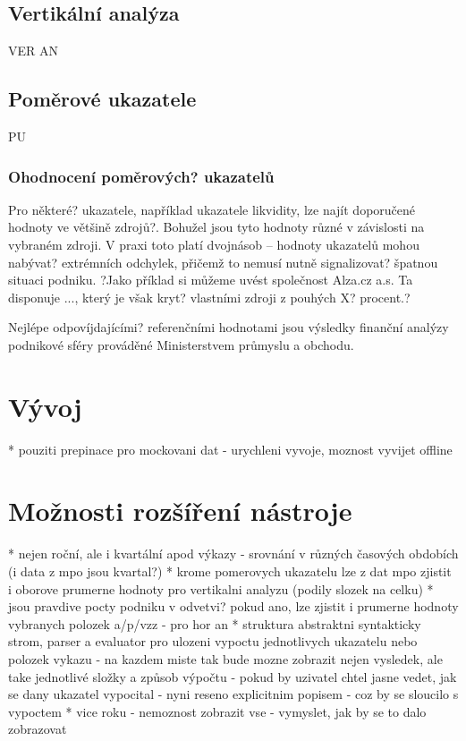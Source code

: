 \subsection{Vertikální analýza}
VER AN

\subsection{Poměrové ukazatele}
PU
\subsubsection{Ohodnocení poměrových? ukazatelů}
Pro některé? ukazatele, například ukazatele likvidity, lze najít doporučené hodnoty ve většině zdrojů?. Bohužel jsou tyto hodnoty různé v závislosti na vybraném zdroji. V praxi toto platí dvojnásob -- hodnoty ukazatelů mohou nabývat? extrémních odchylek, přičemž to nemusí nutně signalizovat? špatnou situaci podniku. ?Jako příklad si můžeme uvést společnost Alza.cz a.s. Ta disponuje ..., který je však kryt? vlastními zdroji z pouhých X? procent.? 

Nejlépe odpovíjdajícími? referenčními hodnotami jsou výsledky finanční analýzy podnikové sféry prováděné Ministerstvem průmyslu a obchodu. 

\section{Vývoj}
* pouziti prepinace pro mockovani dat - urychleni vyvoje, moznost vyvijet offline

\section{Možnosti rozšíření nástroje}
* nejen roční, ale i kvartální apod výkazy - srovnání v různých časových obdobích (i data z mpo jsou kvartal?)
* krome pomerovych ukazatelu lze z dat mpo zjistit i oborove prumerne hodnoty pro vertikalni analyzu (podily slozek na celku)
* jsou pravdive pocty podniku v odvetvi? pokud ano, lze zjistit i prumerne hodnoty vybranych polozek a/p/vzz - pro hor an
* struktura abstraktni syntakticky strom, parser a evaluator pro ulozeni vypoctu jednotlivych ukazatelu nebo polozek vykazu - na kazdem miste tak bude mozne zobrazit nejen vysledek, ale take jednotlivé složky a způsob výpočtu - pokud by uzivatel chtel jasne vedet, jak se dany ukazatel vypocital - nyni reseno explicitnim popisem - coz by se sloucilo s vypoctem
* vice roku - nemoznost zobrazit vse - vymyslet, jak by se to dalo zobrazovat


